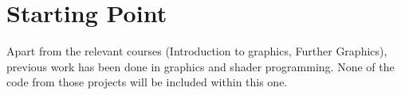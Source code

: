 \section{Starting Point}

Apart from the relevant courses (Introduction to graphics, Further Graphics),
previous work has been done in graphics and shader programming. None of the code
from those projects will be included within this one.
